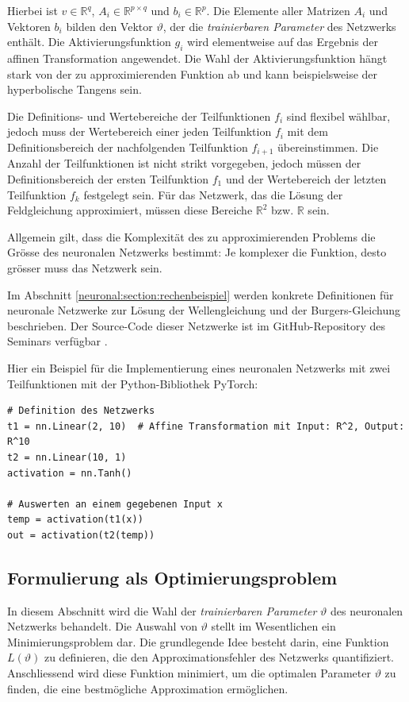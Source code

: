Hierbei ist \( v \in \mathbb{R}^q \), \( A_i \in \mathbb{R}^{p \times q} \) und \( b_i \in \mathbb{R}^p \). Die Elemente aller Matrizen \( A_i \) und Vektoren \( b_i \) bilden den Vektor \( \vartheta \), der die \emph{trainierbaren Parameter} des Netzwerks enthält.
Die Aktivierungsfunktion \( g_i \) wird elementweise auf das Ergebnis der affinen Transformation angewendet.
Die Wahl der Aktivierungsfunktion hängt stark von der zu approximierenden Funktion ab und kann beispielsweise der hyperbolische Tangens sein.

Die Definitions- und Wertebereiche der Teilfunktionen \( f_i \) sind flexibel wählbar, jedoch muss der Wertebereich einer jeden Teilfunktion \( f_i \) mit dem Definitionsbereich der nachfolgenden Teilfunktion \( f_{i+1} \) übereinstimmen.
Die Anzahl der Teilfunktionen ist nicht strikt vorgegeben, jedoch müssen der Definitionsbereich der ersten Teilfunktion \( f_1 \) und der Wertebereich der letzten Teilfunktion \( f_k \) festgelegt sein. 
Für das Netzwerk, das die Lösung der Feldgleichung approximiert, müssen diese Bereiche \( \mathbb{R}^2 \) bzw. \( \mathbb{R} \) sein.

Allgemein gilt, dass die Komplexität des zu approximierenden Problems die Grösse des neuronalen Netzwerks bestimmt: Je komplexer die Funktion, desto grösser muss das Netzwerk sein.

Im Abschnitt \ref{neuronal:section:rechenbeispiel} werden konkrete Definitionen für neuronale Netzwerke zur Lösung der Wellengleichung und der Burgers-Gleichung beschrieben.
Der Source-Code dieser Netzwerke ist im GitHub-Repository des Seminars verfügbar \cite{neuronal:github_source_code}.

Hier ein Beispiel für die Implementierung eines neuronalen Netzwerks mit zwei Teilfunktionen mit der Python-Bibliothek PyTorch:

\begin{lstlisting}
# Definition des Netzwerks
t1 = nn.Linear(2, 10)  # Affine Transformation mit Input: R^2, Output: R^10
t2 = nn.Linear(10, 1)
activation = nn.Tanh()

# Auswerten an einem gegebenen Input x
temp = activation(t1(x))
out = activation(t2(temp))
\end{lstlisting}

\subsection{Formulierung als Optimierungsproblem}\label{neuronal:subsection:optimierungsproblem}
In diesem Abschnitt wird die Wahl der \emph{trainierbaren Parameter} $\vartheta$ des neuronalen Netzwerks behandelt.
Die Auswahl von $\vartheta$ stellt im Wesentlichen ein Minimierungsproblem dar.
Die grundlegende Idee besteht darin, eine Funktion \( L(\vartheta) \) zu definieren, die den Approximationsfehler des Netzwerks quantifiziert.
Anschliessend wird diese Funktion minimiert, um die optimalen Parameter $\vartheta$ zu finden, die eine bestmögliche Approximation ermöglichen.

